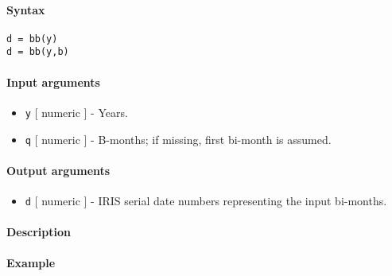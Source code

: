 


	\paragraph{Syntax}\label{syntax}

\begin{verbatim}
d = bb(y)
d = bb(y,b)
\end{verbatim}

\paragraph{Input arguments}\label{input-arguments}

\begin{itemize}
\item
  \texttt{y} {[} numeric {]} - Years.
\item
  \texttt{q} {[} numeric {]} - B-months; if missing, first bi-month is
  assumed.
\end{itemize}

\paragraph{Output arguments}\label{output-arguments}

\begin{itemize}
\itemsep1pt\parskip0pt
\item
  \texttt{d} {[} numeric {]} - IRIS serial date numbers representing the
  input bi-months.
\end{itemize}

\paragraph{Description}\label{description}

\paragraph{Example}\label{example}



